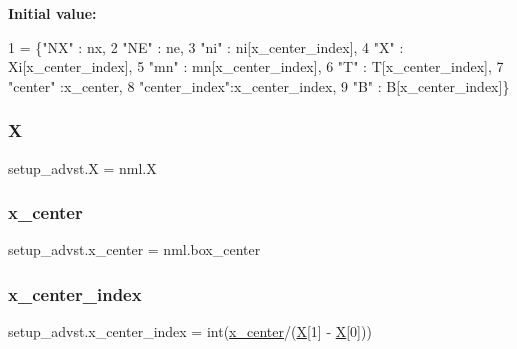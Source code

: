 {\bfseries Initial value\+:}
\begin{DoxyCode}
1 =  \{\textcolor{stringliteral}{"NX"}       : nx,
2              \textcolor{stringliteral}{"NE"}       : ne,
3              \textcolor{stringliteral}{"ni"}       : ni[x\_center\_index],
4              \textcolor{stringliteral}{"X"}        : Xi[x\_center\_index],
5              \textcolor{stringliteral}{"mn"}       : mn[x\_center\_index],
6              \textcolor{stringliteral}{"T"}        : T[x\_center\_index],
7              \textcolor{stringliteral}{"center"}   :x\_center,
8              \textcolor{stringliteral}{"center\_index"}:x\_center\_index,
9              \textcolor{stringliteral}{"B"}        : B[x\_center\_index]\}
\end{DoxyCode}
\mbox{\label{namespacesetup__advst_a4fe22219bfc7363b6decb33a0885e17a}} 
\subsubsection{\texorpdfstring{X}{X}}
{\footnotesize\ttfamily setup\+\_\+advst.\+X = nml.\+X}

\mbox{\label{namespacesetup__advst_a2c4f0bfb8958db00072a21d605c3d35d}} 
\subsubsection{\texorpdfstring{x\+\_\+center}{x\_center}}
{\footnotesize\ttfamily setup\+\_\+advst.\+x\+\_\+center = nml.\+box\+\_\+center}

\mbox{\label{namespacesetup__advst_a2d2df5db7a3292eb8a74abab9e31bf7b}} 
\subsubsection{\texorpdfstring{x\+\_\+center\+\_\+index}{x\_center\_index}}
{\footnotesize\ttfamily setup\+\_\+advst.\+x\+\_\+center\+\_\+index = int(\hyperlink{namespacesetup__advst_a2c4f0bfb8958db00072a21d605c3d35d}{x\+\_\+center}/(\hyperlink{namespacesetup__advst_a4fe22219bfc7363b6decb33a0885e17a}{X}\mbox{[}1\mbox{]} -\/ \hyperlink{namespacesetup__advst_a4fe22219bfc7363b6decb33a0885e17a}{X}\mbox{[}0\mbox{]}))}

